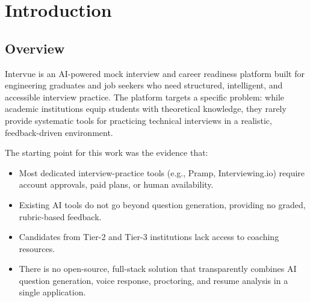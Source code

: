 
\thispagestyle{empty}


\listoftables

\thispagestyle{empty}

\newpage

\chapter{Introduction}
\setcounter{page}{1}
\renewcommand{\baselinestretch}{1.50}

\section{Overview}
Intervue is an AI-powered mock interview and career readiness platform built for engineering
graduates and job seekers who need structured, intelligent, and accessible interview practice.
The platform targets a specific problem: while academic institutions equip students with
theoretical knowledge, they rarely provide systematic tools for practicing technical interviews
in a realistic, feedback-driven environment.

The starting point for this work was the evidence that:
\begin{itemize}
	\item Most dedicated interview-practice tools (e.g., Pramp, Interviewing.io) require account approvals, paid plans, or human availability.
	\item Existing AI tools do not go beyond question generation, providing no graded, rubric-based feedback.
	\item Candidates from Tier-2 and Tier-3 institutions lack access to coaching resources.
	\item There is no open-source, full-stack solution that transparently combines AI question generation, voice response, proctoring, and resume analysis in a single application.
\end{itemize}

